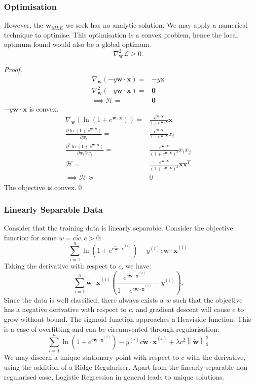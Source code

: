 \subsubsection{Optimisation}
However, the $\mathbf{w}_{MLE}$ we seek has no analytic solution. We may apply
a numerical technique to optimise. This optimisation is a convex problem, hence the
local optimum found would also be a global optimum.
\[\nabla_\mathbf{w}^{2} \mathcal{L}\ge 0.\] 
\begin{proof}
  \begin{align*}
    \nabla_\mathbf{w} (-y\mathbf{w\cdot x})=&-y\mathbf{x}\\
    \nabla_\mathbf{w}^{2} (-y\mathbf{w\cdot x})=&\mathbf{0}\\
    \implies \mathcal{H}=&\mathbf{0}
  \end{align*}
  $-y\mathbf{w\cdot x}$ is convex.\\
  \begin{align*}
  \nabla_\mathbf{w}\left(  \ln(1+e^{\mathbf{w\cdot x}}) \right)=&\frac{e^{\mathbf{w\cdot x}}}{1+e^{\mathbf{w\cdot x}}} \mathbf{x}\\
  \frac{\partial \ln(1+e^{\mathbf{w\cdot x}})}{\partial w_i} =&\frac{e^{\mathbf{w\cdot x}}}{1+e^{\mathbf{w\cdot x}}} x_i\\
  \frac{\partial^{2} \ln(1+e^{\mathbf{w\cdot x}})}{\partial w_i\partial w_j} =&\frac{e^{\mathbf{w\cdot x}}}{{(1+e^{\mathbf{w\cdot x}})}^{2}} x_i x_j\\
  \mathcal{H}=&\frac{e^{\mathbf{w\cdot x}}}{{(1+e^{\mathbf{w\cdot x}})}^{2}}\mathbf{xx}^{T}\\
  \implies\mathcal{H}\succeq&0
  \end{align*}
  The objective is convex.\qed%
\end{proof}
\subsubsection{Linearly Separable Data}
Consider that the training data is linearly separable. Consider the objective
function for some $w=c\tilde{w}, c>0$:
\[\sum_{i=1}^{n} \ln\left( 1+e^{c\mathbf{\tilde{w}\cdot x}^{(i)}} \right)-y^{(i)}c\mathbf{\tilde{w}\cdot x}^{(i)}\] 
Taking the derivative with respect to $c$, we have:
 \[\sum_{i=1}^{n} \mathbf{\tilde{w}\cdot x}^{(i)}\left( \frac{e^{c\mathbf{\tilde{w}\cdot x}^{(i)}}}{1+e^{c\mathbf{\tilde{w}\cdot x}^{(i)}}}-y^{(i)} \right).\]
Since the data is well classified, there always exists a $\tilde{w}$ such that
the objective has a negative derivative with respect to $c$, and gradient
descent will cause $c$ to grow without bound. The sigmoid function approaches
a Heaviside function. This is a case of overfitting and can be circumvented
through regularisation:
\[\sum_{i=1}^{n} \ln\left( 1+e^{c\mathbf{\tilde{w}\cdot x}^{(i)}} \right)-y^{(i)}c\mathbf{\tilde{w}\cdot x}^{(i)}+\lambda c^{2}\left\lVert \mathbf{\tilde{w}} \right\rVert_2^{2} \]
We may discern a unique stationary point with respect to $c$ with the
derivative, using the addition of a Ridge Regulariser. Apart from the linearly
separable non-regularised case, Logistic Regression in general leads to unique
solutions.
